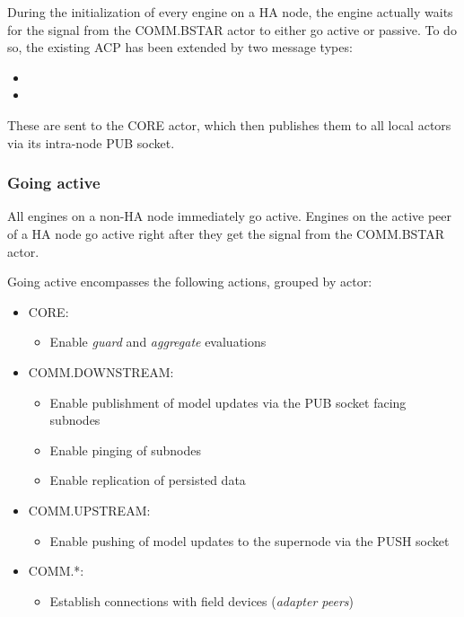During the initialization of every engine on a HA node, the engine actually
waits for the signal from the COMM.BSTAR actor to either go active or passive.
To do so, the existing \gls{ACP} has been extended by two message types:
\begin{itemize}
	\item {}
	\item {}
\end{itemize}

These are sent to the CORE actor, which then publishes them to all local actors
via its intra-node PUB socket.

\subsubsection{Going active}
All engines on a non-HA node immediately go active. Engines on the active peer
of a HA node go active right after they get the signal from the COMM.BSTAR
actor.

Going active encompasses the following actions, grouped by actor:
\begin{itemize}
	\item CORE:
		\begin{itemize}
			\item Enable \emph{guard} and \emph{aggregate} evaluations
		\end{itemize}
	\item COMM.DOWNSTREAM:
		\begin{itemize}
			\item Enable publishment of model updates via the PUB socket facing subnodes
			\item Enable pinging of subnodes
			\item Enable replication of persisted data
		\end{itemize}
	\item COMM.UPSTREAM:
		\begin{itemize}
			\item Enable pushing of model updates to the supernode via the PUSH socket
		\end{itemize}
	\item COMM.*:
		\begin{itemize}
			\item Establish connections with field devices (\emph{adapter peers})
		\end{itemize}
\end{itemize}


